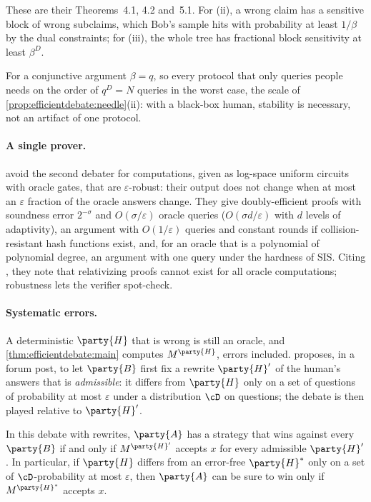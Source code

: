 \begin{refsection}
\begin{proofsketch}
These are their Theorems~4.1, 4.2 and~5.1. For (ii), a wrong claim has a sensitive block of wrong subclaims, which Bob's sample hits with probability at least $1/\beta$ by the dual constraints; for (iii), the whole tree has fractional block sensitivity at least $\beta^D$.
\end{proofsketch}

For a conjunctive argument $\beta=q$, so every protocol that only queries people needs on the order of $q^D=N$ queries in the worst case, the scale of \cref{prop:efficientdebate:needle}(ii): with a black-box human, stability is necessary, not an artifact of one protocol.

\paragraph{A single prover.} \Textcite{ChenKalaiXi2026} avoid the second debater for computations, given as log-space uniform circuits with oracle gates, that are $\varepsilon$-robust: their output does not change when at most an $\varepsilon$ fraction of the oracle answers change. They give doubly-efficient proofs with soundness error $2^{-\sigma}$ and $O(\sigma/\varepsilon)$ oracle queries ($O(\sigma d/\varepsilon)$ with $d$ levels of adaptivity), an argument with $O(1/\varepsilon)$ queries and constant rounds if collision-resistant hash functions exist, and, for an oracle that is a polynomial of polynomial degree, an argument with one query under the hardness of SIS. Citing \textcite{BarbaraChiesaGuan2025}, they note that relativizing proofs cannot exist for all oracle computations; robustness lets the verifier spot-check.

\paragraph{Systematic errors.} A deterministic $\party{H}$ that is wrong is still an oracle, and \cref{thm:efficientdebate:main} computes $M^{\party{H}}$, errors included. \Textcite{Irving2025} proposes, in a forum post, to let $\party{B}$ first fix a rewrite $\party{H}'$ of the human's answers that is \emph{admissible}: it differs from $\party{H}$ only on a set of questions of probability at most $\varepsilon$ under a distribution $\cD$ on questions; the debate is then played relative to $\party{H}'$.

\begin{proposition}\label{prop:efficientdebate:rewrite}
In this debate with rewrites, $\party{A}$ has a strategy that wins against every $\party{B}$ if and only if $M^{\party{H}'}$ accepts $x$ for every admissible $\party{H}'$. In particular, if $\party{H}$ differs from an error-free $\party{H}^*$ only on a set of $\cD$-probability at most $\varepsilon$, then $\party{A}$ can be sure to win only if $M^{\party{H}^*}$ accepts $x$.
\end{proposition}


\end{refsection}
